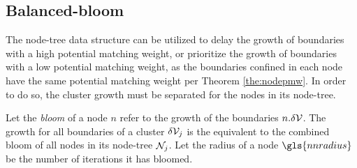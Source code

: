 
\subsection{Balanced-bloom}

The node-tree data structure can be utilized to delay the growth of boundaries with a high potential matching weight, or prioritize the growth of boundaries with a low potential matching weight, as the boundaries confined in each node have the same potential matching weight per Theorem \ref{the:nodepmw}. In order to do so, the cluster growth must be separated for the nodes in its node-tree. 

\begin{definition}\label{def:bloom}
  Let the \emph{bloom} of a node $n$ refer to the growth of the boundaries $n.\delta\mathcal{V}$. The growth for all boundaries of a cluster $
  \delta\mathcal{V}_j$ is the equivalent to the combined bloom of all nodes in its node-tree $\mathcal{N}_j$. Let the radius of a node $\gls{nnradius}$ be the number of iterations it has bloomed. 
\end{definition}

